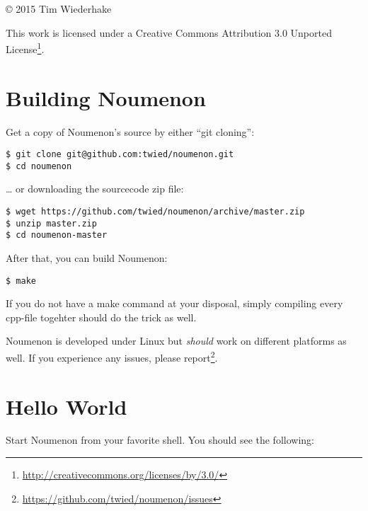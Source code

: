 \documentclass[a4paper, parskip, 10pt]{scrartcl}
\author     {\myAuthor}
\title      {\myTitle}
\subtitle   {\mySubtitle}
\date       {\myDate}
\begin{document}
\maketitle

\begin{abstract}
    \noindent Noumenon is a dynamic, strongly typed script language. It is
    simple, yet powerful and extensible. In contrast to many other languages,
    there is no automatic type conversion in Noumenon.
\end{abstract}

\clearpage{}
\tableofcontents{}
\vfill{}
\copyright{} 2015 Tim Wiederhake

This work is licensed under a Creative Commons Attribution 3.0 Unported
License\footnote{
\href{http://creativecommons.org/licenses/by/3.0/}
{http://creativecommons.org/licenses/by/3.0/}}.
\clearpage{}


\section{Building Noumenon}
Get a copy of Noumenon's source by either \enquote{git cloning}:

\begin{lstlisting}[language={}]
$ git clone git@github.com:twied/noumenon.git
$ cd noumenon
\end{lstlisting}

\ldots{} or downloading the sourcecode zip file:
\begin{lstlisting}[language={}]
$ wget https://github.com/twied/noumenon/archive/master.zip
$ unzip master.zip
$ cd noumenon-master
\end{lstlisting}

After that, you can build Noumenon:
\begin{lstlisting}[language={}]
$ make
\end{lstlisting}

If you do not have a make command at your disposal, simply compiling every
cpp-file togehter should do the trick as well.

Noumenon is developed under Linux but \emph{should} work on different platforms
as well. If you experience any issues, please report\footnote{
\href{https://github.com/twied/noumenon/issues}
{https://github.com/twied/noumenon/issues}}.

\section{Hello World}
Start Noumenon from your favorite shell. You should see the following:
\end{document}

